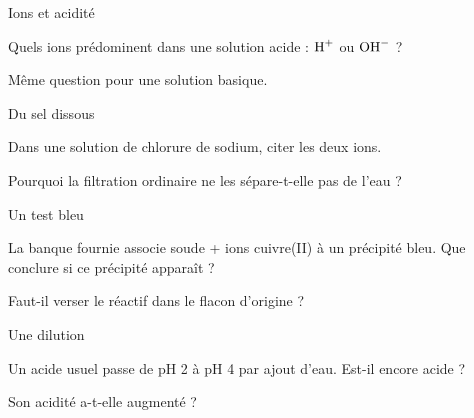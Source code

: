\par\noindent\begin{minipage}{\linewidth}
\begin{exercice}[1]{Ions et acidité}
\begin{questions}
\item Quels ions prédominent dans une solution acide : $\ce{H+}$ ou $\ce{OH-}$ ?
\item Même question pour une solution basique.
\end{questions}
\end{exercice}
\end{minipage}
\par\noindent\begin{minipage}{\linewidth}
\begin{exercice}[1]{Du sel dissous}
\begin{questions}
\item Dans une solution de chlorure de sodium, citer les deux ions.
\item Pourquoi la filtration ordinaire ne les sépare-t-elle pas de l’eau ?
\end{questions}
\end{exercice}
\end{minipage}
\par\noindent\begin{minipage}{\linewidth}
\begin{exercice}[1]{Un test bleu}
\begin{questions}
\item La banque fournie associe soude + ions cuivre(II) à un précipité bleu. Que conclure si ce précipité apparaît ?
\item Faut-il verser le réactif dans le flacon d’origine ?
\end{questions}
\end{exercice}
\end{minipage}
\clearpage{}
\par\noindent\begin{minipage}{\linewidth}
\begin{exercice}[2]{Une dilution}
\begin{questions}
\item Un acide usuel passe de pH 2 à pH 4 par ajout d’eau. Est-il encore acide ?
\item Son acidité a-t-elle augmenté ?
\end{questions}
\end{exercice}
\end{minipage}
